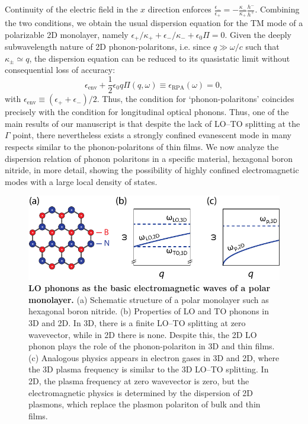 \documentclass[aps,prb,twocolumn,
	           groupedaddress,superscriptaddress,
               amsfonts,amssymb,amsmath,floatfix,
	           citeautoscript]{revtex4-1}
\makeatletter
\newcommand{\ie}{i.e.\@\xspace} %
\newcommand{\comment}[2]{%
    \ifbool{togglecomments}%
    {\textcolor{blue!70!black}{\small\textsf{%
    \textsuperscript{\textsc{\textsf{\MakeLowercase{#1}}}}%
    [#2]}}} %
    {}}     %
\makeatother
\begin{document}
Continuity of the electric field in the $x$ direction enforces $\frac{\epsilon_-}{\epsilon_+} = -\frac{\kappa_-}{\kappa_+}\frac{h^-}{h^+}$. 
Combining the two conditions, we obtain the usual dispersion equation for the TM mode of a polarizable 2D monolayer, namely $\epsilon_+/\kappa_+ + \epsilon_-/\kappa_- +\epsilon_0\Pi=0$. Given the deeply subwavelength nature of 2D phonon-polaritons, \ie since $q\gg\omega/c$ such that $\kappa_{\pm}\simeq q$, the dispersion equation can be reduced to its quasistatic limit without consequential loss of accuracy:
\begin{equation}
    \epsilon_{\mathrm{env}} + \frac{1}{2}\epsilon_0 q \Pi(q,\omega) \equiv \epsilon_{\mathrm{RPA}}(\omega) = 0,
    \label{eq:dispeq}
\end{equation}
with $\epsilon_{\mathrm{env}}\equiv (\epsilon_++\epsilon_-)/2$. Thus, the condition for `phonon-polaritons' coincides precisely with the condition for longitudinal optical phonons.  Thus, one of the main results of our manuscript is that despite the lack of LO--TO splitting at the $\Gamma$ point, there nevertheless exists a strongly confined evanescent mode in many respects similar to the phonon-polaritons of thin films. We now analyze the dispersion relation of phonon polaritons in a specific material, hexagonal boron nitride, in more detail, showing the possibility of highly confined electromagnetic modes with a large local density of states. 

\begin{figure}[t]
    \includegraphics[width=0.95\linewidth]{fig1.pdf}
    \caption{%
        \textbf{LO phonons as the basic electromagnetic waves of a polar monolayer.} (a) Schematic structure of a polar monolayer such as hexagonal boron nitride. (b) Properties of LO and TO phonons in 3D and 2D. In 3D, there is a finite LO--TO splitting at zero wavevector, while in 2D there is none. Despite this, the 2D LO phonon plays the role of the phonon-polariton in 3D and thin films. (c) Analogous physics appears in electron gases in 3D and 2D, where the 3D plasma frequency is similar to the 3D LO--TO splitting. In 2D, the plasma frequency at zero wavevector is zero, but the electromagnetic physics is determined by the dispersion of 2D plasmons, which replace the plasmon polariton of bulk and thin films.
        \label{fig:1}
        }
\end{figure}~
\end{document}
